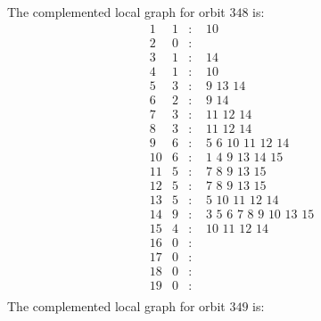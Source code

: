 \documentclass[12pt]{article}
\begin{document}
The complemented local graph for orbit $348$ is:
\begin{equation*}
\begin{array}{rrcl}
1&1&:&\,\,10\\
2&0&:&\\
3&1&:&\,\,14\\
4&1&:&\,\,10\\
5&3&:&\,\,9\,\,13\,\,14\\
6&2&:&\,\,9\,\,14\\
7&3&:&\,\,11\,\,12\,\,14\\
8&3&:&\,\,11\,\,12\,\,14\\
9&6&:&\,\,5\,\,6\,\,10\,\,11\,\,12\,\,14\\
10&6&:&\,\,1\,\,4\,\,9\,\,13\,\,14\,\,15\\
11&5&:&\,\,7\,\,8\,\,9\,\,13\,\,15\\
12&5&:&\,\,7\,\,8\,\,9\,\,13\,\,15\\
13&5&:&\,\,5\,\,10\,\,11\,\,12\,\,14\\
14&9&:&\,\,3\,\,5\,\,6\,\,7\,\,8\,\,9\,\,10\,\,13\,\,15\\
15&4&:&\,\,10\,\,11\,\,12\,\,14\\
16&0&:&\\
17&0&:&\\
18&0&:&\\
19&0&:&\\
\end{array}
\end{equation*}
The complemented local graph for orbit $349$ is:
\end{document}

